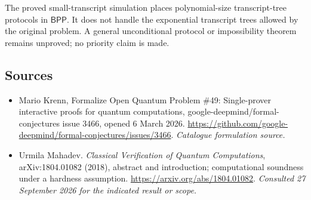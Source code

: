 \documentclass[11pt,a4paper]{article}
\numberwithin{equation}{section}
\begin{document}
The proved small-transcript simulation places polynomial-size transcript-tree
protocols in $\mathsf{BPP}$.  It does not handle the exponential transcript
trees allowed by the original problem.  A general unconditional protocol
or impossibility theorem remains unproved; no priority claim is made.
\subsection{Sources}
\begin{itemize}\raggedright
\item[\textnormal{[S1]}]\hypertarget{source:statement:1}{} Mario Krenn, Formalize Open Quantum Problem \#49: Single-prover interactive proofs for quantum computations, google-deepmind/formal-conjectures issue 3466, opened 6 March 2026.
\url{https://github.com/google-deepmind/formal-conjectures/issues/3466}.
{\small\textit{Catalogue formulation source.}}
\item[\textnormal{[E1]}]\hypertarget{extra:statement:1}{} Urmila Mahadev.
\emph{Classical Verification of Quantum Computations}, arXiv:1804.01082 (2018), abstract and introduction; computational soundness under a hardness assumption.
\url{https://arxiv.org/abs/1804.01082}.
{\small\textit{Consulted 27 September 2026 for the indicated result or scope.}}
\end{itemize}
\end{document}
